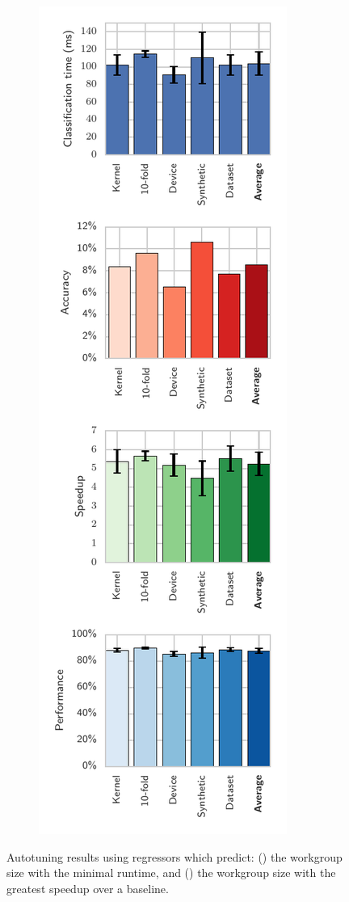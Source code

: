\documentclass[nonatbib,preprint,10pt]{sigplanconf}
\begin{document}
\begin{figure}
\begin{subfigure}[h]{.48\columnwidth}
\caption{}
\label{fig:runtime-class-xval}
\end{subfigure}
\begin{subfigure}[h]{.48\columnwidth}
\centering
\includegraphics[width=\columnwidth]{img/speedup-class-xval}
\caption{}
\label{fig:speedup-class-xval}
\end{subfigure}
\caption[Autotuning performance using regressors]{%
  Autotuning results using regressors which predict:
  () the workgroup size with the
  minimal runtime, and () the workgroup
  size with the greatest speedup over a baseline.%
}
\label{fig:regression-class}
\end{figure}
\end{document}
